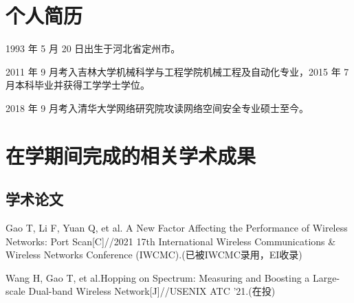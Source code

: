 
\begin{resume}

  \section*{个人简历}

  1993 年 5 月 20 日出生于河北省定州市。

  2011 年 9 月考入吉林大学机械科学与工程学院机械工程及自动化专业，2015 年 7 月本科毕业并获得工学学士学位。

  2018 年 9 月考入清华大学网络研究院攻读网络空间安全专业硕士至今。


  \section*{在学期间完成的相关学术成果}

  \subsection*{学术论文}

  \begin{achievements}
    \item Gao T, Li F, Yuan Q, et al. A New Factor Affecting the Performance of Wireless Networks: Port Scan[C]//2021 17th International Wireless Communications \& Wireless Networks Conference (IWCMC).(已被IWCMC录用，EI收录)
    \item Wang H, Gao T, et al.Hopping on Spectrum: Measuring and Boosting a Large-scale Dual-band Wireless Network[J]//USENIX ATC '21.(在投)
  \end{achievements}




\end{resume}
